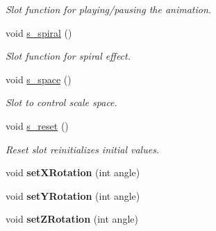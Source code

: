 \begin{DoxyCompactItemize}
\begin{DoxyCompactList}\small\item\em Slot function for playing/pausing the animation. \end{DoxyCompactList}\item 
\hypertarget{class_g_l_widget_a8820beb590afc1fd5709295a76d908a7}{}void \hyperlink{class_g_l_widget_a8820beb590afc1fd5709295a76d908a7}{s\+\_\+spiral} ()\label{class_g_l_widget_a8820beb590afc1fd5709295a76d908a7}

\begin{DoxyCompactList}\small\item\em Slot function for spiral effect. \end{DoxyCompactList}\item 
\hypertarget{class_g_l_widget_a5a6ff71edf2aa3dd064da7fe688fad0a}{}void \hyperlink{class_g_l_widget_a5a6ff71edf2aa3dd064da7fe688fad0a}{s\+\_\+space} ()\label{class_g_l_widget_a5a6ff71edf2aa3dd064da7fe688fad0a}

\begin{DoxyCompactList}\small\item\em Slot to control scale space. \end{DoxyCompactList}\item 
void \hyperlink{class_g_l_widget_ab82b7ae2912130fc5c990da90a75d19b}{s\+\_\+reset} ()
\begin{DoxyCompactList}\small\item\em Reset slot reinitializes initial values. \end{DoxyCompactList}\item 
\hypertarget{class_g_l_widget_a7083404e9ab8feffb2c486f7c15308ce}{}void {\bfseries set\+X\+Rotation} (int angle)\label{class_g_l_widget_a7083404e9ab8feffb2c486f7c15308ce}

\item 
\hypertarget{class_g_l_widget_a29012eba3cb4201f78807066f2c9dcd4}{}void {\bfseries set\+Y\+Rotation} (int angle)\label{class_g_l_widget_a29012eba3cb4201f78807066f2c9dcd4}

\item 
\hypertarget{class_g_l_widget_a6f6b4fbbcc566d999db7e53aadeba889}{}void {\bfseries set\+Z\+Rotation} (int angle)\label{class_g_l_widget_a6f6b4fbbcc566d999db7e53aadeba889}

\end{DoxyCompactItemize}
